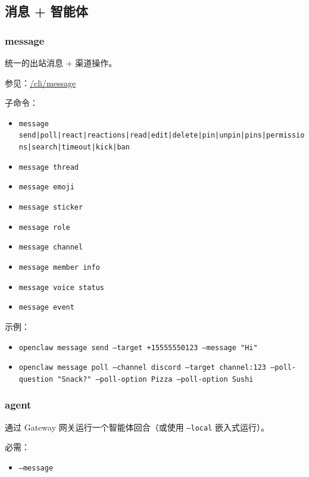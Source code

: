 \subsection{消息 + 智能体}


\subsubsection{message}


统一的出站消息 + 渠道操作。

参见：\href{/cli/message}{/cli/message}

子命令：

\begin{itemize}
  \item \texttt{message send|poll|react|reactions|read|edit|delete|pin|unpin|pins|permissions|search|timeout|kick|ban}
  \item \texttt{message thread }
  \item \texttt{message emoji }
  \item \texttt{message sticker }
  \item \texttt{message role }
  \item \texttt{message channel }
  \item \texttt{message member info}
  \item \texttt{message voice status}
  \item \texttt{message event }
\end{itemize}


示例：

\begin{itemize}
  \item \texttt{openclaw message send --target +15555550123 --message "Hi"}
  \item \texttt{openclaw message poll --channel discord --target channel:123 --poll-question "Snack?" --poll-option Pizza --poll-option Sushi}
\end{itemize}


\subsubsection{agent}


通过 Gateway 网关运行一个智能体回合（或使用 \texttt{--local} 嵌入式运行）。

必需：

\begin{itemize}
  \item \texttt{--message }
\end{itemize}


